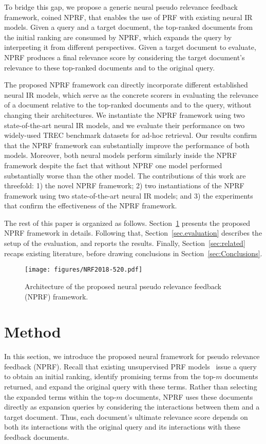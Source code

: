 \documentclass[11pt,a4paper]{article}
\begin{document}
To bridge this gap, we propose a generic neural pseudo relevance feedback framework, coined NPRF,
that enables the use of PRF with existing neural IR models.
Given a query and a target document, the top-ranked documents from the initial ranking
are consumed by NPRF, which
expands the query by interpreting it from different perspectives.
Given a target document to evaluate,
NPRF produces a final relevance score by considering the target document's relevance
to these top-ranked documents and to the original query.


The proposed NPRF framework can directly incorporate different established neural IR models,
which serve as the concrete scorers in evaluating the relevance of a document relative to 
the top-ranked documents and to the query, without changing their architectures.
We instantiate the NPRF framework using two state-of-the-art neural IR models, and 
we evaluate their performance on two widely-used TREC benchmark datasets for ad-hoc retrieval. 
Our results
confirm that the NPRF framework can substantially improve the performance of both models.
Moreover, both neural models perform similarly inside the NPRF framework despite the fact
that without NPRF one model performed substantially worse than the other model.
The contributions of this work are threefold: 1) the novel NPRF framework; 2)
two instantiations of the NPRF framework using
two state-of-the-art neural IR models;
and 3) the experiments that confirm the effectiveness of the
NPRF framework.

The rest of this paper is organized as follows. Section~\ref{sec:Method} presents the proposed NPRF framework in details. Following that, Section~\ref{sec.evaluation} describes the setup of the evaluation, and reports the results. Finally, Section~\ref{sec:related} recaps existing literature, before drawing conclusions in Section~\ref{sec:Conclusions}. \begin{figure*}
    \centering
      \texttt{[image: figures/NRF2018-520.pdf]}
    \caption{Architecture of the proposed neural pseudo relevance feedback (NPRF) framework.}\label{fig.cprfarch}
\end{figure*}

\vspace{\vignore}
\section{Method}\label{sec:Method}
\vspace{\vignore}
In this section, we introduce the proposed neural framework for pseudo relevance feedback (NPRF).
Recall that existing unsupervised PRF models~\cite{rocchio1971relevance,DBLP:conf/sigir/LavrenkoC01,DBLP:conf/trec/YeHHYL09} issue a query 
to obtain an initial ranking, 
identify promising terms from the top-$m$ documents returned,
and expand the original query with these terms.
Rather than selecting the expanded terms within the top-$m$ documents, NPRF uses these documents directly 
as expansion queries by considering the interactions between them and a target document. Thus, each document's ultimate relevance score depends on both its interactions with the original query
and its interactions with these feedback documents.
\end{document}

